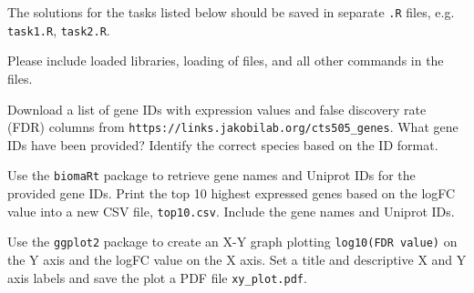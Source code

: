 \documentclass[11pt,largemargins, letter]{homework}
\begin{document}
\maketitle

The solutions for the tasks listed below should be saved in separate \texttt{.R} files, e.g. \texttt{task1.R}, \texttt{task2.R}.

Please include loaded libraries, loading of files, and all other commands in the files.

\question

  \begin{alphaparts}
    \questionpart Download a list of gene IDs with expression values and false discovery rate (FDR) columns from \texttt{https://links.jakobilab.org/cts505\_genes}.
    \questionpart What gene IDs have been provided?
    Identify the correct species based on the ID format.
  \end{alphaparts}


\question

  \begin{alphaparts}
    \questionpart Use the \texttt{biomaRt} package to retrieve gene names and Uniprot IDs for the provided gene IDs.
    \questionpart Print the top 10 highest expressed genes based on the logFC value into a new CSV file, \texttt{top10.csv}.
    Include the gene names and Uniprot IDs.
  \end{alphaparts}

\question

  \begin{alphaparts}
    \questionpart Use the \texttt{ggplot2} package to create an X-Y graph plotting \texttt{log10(FDR value)} on the Y axis and the logFC value on the X axis.
    \questionpart Set a title and descriptive X and Y axis labels and save the plot a PDF file \texttt{xy\_plot.pdf}.
  \end{alphaparts}
\end{document}
